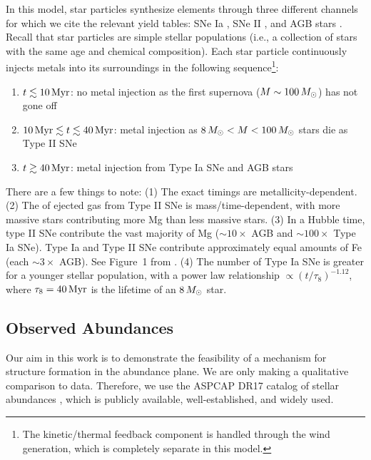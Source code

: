 In this model, star particles synthesize elements through three different channels for which we cite the relevant yield tables: SNe Ia \citep{1997NuPhA.621..467N}, SNe II \citep{1998A&A...334..505P,2006ApJ...653.1145K}, and AGB stars \citep{2010MNRAS.403.1413K,2014MNRAS.437..195D,2014ApJ...797...44F}. Recall that star particles are simple stellar populations (i.e., a collection of stars with the same age and chemical composition). Each star particle continuously injects metals into its surroundings in the following sequence\footnote{The kinetic/thermal feedback component is handled through the wind generation, which is completely separate in this model.}:
\begin{enumerate}
    \item $t\lesssim10\,\textrm{Myr}$: no metal injection as the first supernova ($M\sim100\,M_{\odot}$) has not gone off
    \item $10\,\textrm{Myr} \lesssim t \lesssim 40\,\textrm{Myr}$: metal injection as $8\,M_{\odot}<M<100\,M_{\odot}$ stars die as Type II SNe
    \item $t\gtrsim40\,\textrm{Myr}$: metal injection from Type Ia SNe and AGB stars
\end{enumerate}
There are a few things to note: (1) The exact timings are metallicity-dependent. (2) The \MgFe{} of ejected gas from Type II SNe is mass/time-dependent, with more massive stars contributing more Mg than less massive stars. (3) In a Hubble time, type II SNe contribute the vast majority of Mg ($\sim10\times$ AGB and $\sim100\times$ Type Ia SNe). Type Ia and Type II SNe contribute approximately equal amounts of Fe (each $\sim3\times$ AGB). See Figure~1 from \citet{2018MNRAS.473.4077P}. (4) The number of Type Ia SNe is greater for a younger stellar population, with a power law relationship $\propto \left(t/\tau_8\right)^{-1.12}$, where $\tau_8=40\,\textrm{Myr}$ is the lifetime of an $8\,M_{\odot}$ star.

\subsection{Observed Abundances}\label{ssec:obs_abund}
Our aim in this work is to demonstrate the feasibility of a mechanism for structure formation in the abundance plane. We are only making a qualitative comparison to data. Therefore, we use the ASPCAP DR17 catalog of stellar abundances \citep[][J.A.~Holtzman et al., in preparation]{2016AJ....151..144G}, which is publicly available, well-established, and widely used.

